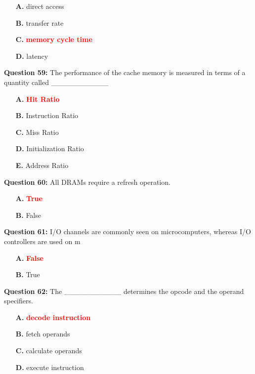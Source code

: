 \documentclass[12pt,a4paper]{article}
\begin{document}
\begin{itemize}
    \item[\textbf{A.}] direct access
    \item[\textbf{B.}] transfer rate
    \item[\textbf{C.}] \textcolor{red}{\textbf{memory cycle time}}
    \item[\textbf{D.}] latency
\end{itemize}

\vspace{0.5cm}

\textbf{Question 59:} The performance of the cache memory is measured in terms of a quantity called ___________

\begin{itemize}
    \item[\textbf{A.}] \textcolor{red}{\textbf{Hit Ratio}}
    \item[\textbf{B.}] Instruction Ratio
    \item[\textbf{C.}] Miss Ratio
    \item[\textbf{D.}] Initialization Ratio
    \item[\textbf{E.}] Address Ratio
\end{itemize}

\vspace{0.5cm}

\textbf{Question 60:} All DRAMs require a refresh operation.

\begin{itemize}
    \item[\textbf{A.}] \textcolor{red}{\textbf{True}}
    \item[\textbf{B.}] False
\end{itemize}

\vspace{0.5cm}

\textbf{Question 61:} I/O channels are commonly seen on microcomputers, whereas I/O controllers are used on m

\begin{itemize}
    \item[\textbf{A.}] \textcolor{red}{\textbf{False}}
    \item[\textbf{B.}] True
\end{itemize}

\vspace{0.5cm}

\textbf{Question 62:} The ___________ determines the opcode and the operand specifiers.

\begin{itemize}
    \item[\textbf{A.}] \textcolor{red}{\textbf{decode instruction}}
    \item[\textbf{B.}] fetch operands
    \item[\textbf{C.}] calculate operands
    \item[\textbf{D.}] execute instruction
\end{itemize}
\end{document}
